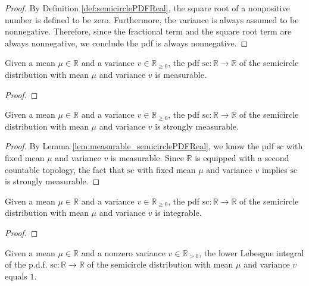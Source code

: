 \begin{proof}
   By Definition \ref{def:semicirclePDFReal}, the square root of a nonpositive number is defined to be zero. 
   Furthermore, the variance is always assumed to be nonnegative.
   Therefore, since the fractional term and the square root term are always nonnegative,
   we conclude the pdf is always nonnegative. 
\end{proof}
\begin{lemma}\label{lem:measurable_semicirclePDFReal}
    \uses{}
    \notready
    Given a mean $\mu \in \mathbb{R}$ and a variance $v \in \mathbb{R}_{\geq 0}$, the pdf $\mathrm{sc} : \mathbb{R} \rightarrow \mathbb{R}$ 
    of the semicircle distribution with mean $\mu$ and variance $v$ is measurable.
\end{lemma}
\begin{proof}
\end{proof}
\begin{lemma}\label{lem:stronglyMeasurable_semicirclePDFReal}
    \mathlibok
    Given a mean $\mu \in \mathbb{R}$ and a variance $v \in \mathbb{R}_{\geq 0}$, the pdf $\mathrm{sc} : \mathbb{R} \rightarrow \mathbb{R}$ 
    of the semicircle distribution with mean $\mu$ and variance $v$ is strongly measurable.
\end{lemma}
\begin{proof}
    By Lemma \ref{lem:measurable_semicirclePDFReal}, we know the pdf $\mathrm{sc}$ with fixed mean $\mu$ and variance $v$ is measurable.
    Since $\mathbb{R}$ is equipped with a second countable topology, the fact that $\mathrm{sc}$ with fixed mean $\mu$ and variance $v$ implies $\mathrm{sc}$ is strongly measurable.  
\end{proof}
\begin{lemma}\label{lem:integrable_semicirclePDFReal}
    \notready
    Given a mean $\mu \in \mathbb{R}$ and a variance $v \in \mathbb{R}_{\geq 0}$, the pdf $\mathrm{sc} : \mathbb{R} \rightarrow \mathbb{R}$ 
    of the semicircle distribution with mean $\mu$ and variance $v$ is integrable.
\end{lemma}
\begin{proof}
\end{proof}
\begin{lemma}\label{lem:lintegral_semicirclePDFReal_eq_one}
    \notready
    Given a mean $\mu \in \mathbb{R}$ and a nonzero variance $v \in \mathbb{R}_{> 0}$, the lower Lebesgue integral of the p.d.f. $\mathrm{sc} : \mathbb{R} \rightarrow \mathbb{R}$ 
    of the semicircle distribution with mean $\mu$ and variance $v$ equals $1$.
\end{lemma}
